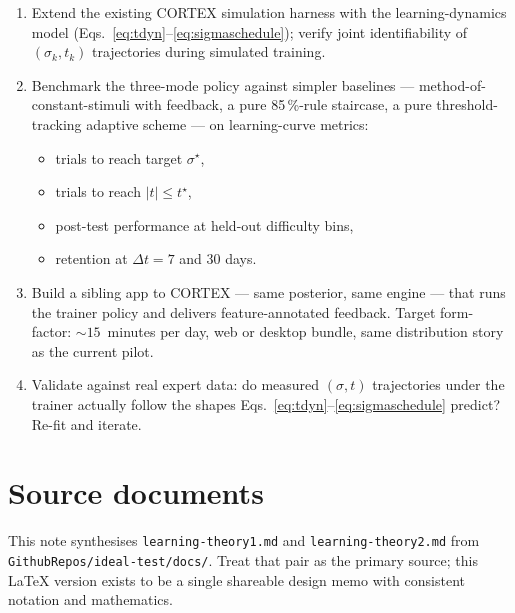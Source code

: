 \documentclass[11pt]{article}
\begin{document}
\begin{enumerate}[leftmargin=*,itemsep=2pt]
  \item Extend the existing CORTEX simulation harness with the
        learning-dynamics model
        (Eqs.~\ref{eq:tdyn}--\ref{eq:sigmaschedule}); verify joint
        identifiability of $(\sigma_k, t_k)$ trajectories during
        simulated training.
  \item Benchmark the three-mode policy against simpler baselines —
        method-of-constant-stimuli with feedback, a pure 85\,\%-rule
        staircase, a pure threshold-tracking adaptive scheme — on
        learning-curve metrics:
        \begin{itemize}[leftmargin=*,itemsep=1pt]
          \item trials to reach target $\sigma^\star$,
          \item trials to reach $|t|\le t^\star$,
          \item post-test performance at held-out difficulty bins,
          \item retention at $\Delta t = 7$ and $30$ days.
        \end{itemize}
  \item Build a sibling app to CORTEX — same posterior, same
        engine — that runs the trainer policy and delivers
        feature-annotated feedback. Target form-factor: $\sim
        15$~minutes per day, web or desktop bundle, same distribution
        story as the current pilot.
  \item Validate against real expert data: do measured $(\sigma,t)$
        trajectories under the trainer actually follow the shapes
        Eqs.~\ref{eq:tdyn}--\ref{eq:sigmaschedule} predict? Re-fit and
        iterate.
\end{enumerate}

\section*{Source documents}
This note synthesises \texttt{learning-theory1.md} and
\texttt{learning-theory2.md} from \texttt{GithubRepos/ideal-test/docs/}.
Treat that pair as the primary source; this LaTeX version exists to be
a single shareable design memo with consistent notation and
mathematics.
\end{document}
